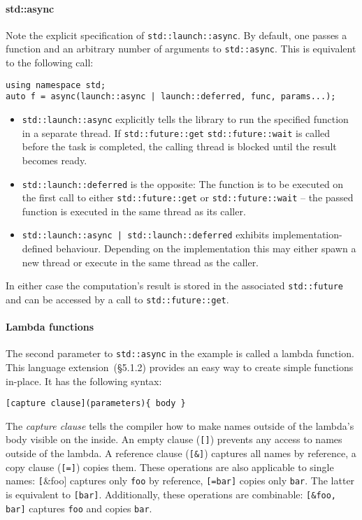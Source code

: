\paragraph{std::async}

Note the explicit specification of \texttt{std::launch::async}. By default, one passes a function and an arbitrary number of arguments to \texttt{std::async}. This is equivalent to the following call:

\begin{lstlisting}
using namespace std;
auto f = async(launch::async | launch::deferred, func, params...);
\end{lstlisting}

\begin{itemize}
\item \texttt{std::launch::async} explicitly tells the library to run the specified function in a separate thread. If \texttt{std::future::get} \texttt{std::future::wait} is called before the task is completed, the calling thread is blocked until the result becomes ready.
\item \texttt{std::launch::deferred} is the opposite: The function is to be executed on the first call to either \texttt{std::future::get} or \texttt{std::future::wait} -- the passed function is executed in the same thread as its caller.
\item \texttt{std::launch::async | std::launch::deferred} exhibits implementation-defined behaviour. Depending on the implementation this may either spawn a new thread or execute in the same thread as the caller.
\end{itemize}

In either case the computation's result is stored in the associated \texttt{std::future} and can be accessed by a call to \texttt{std::future::get}.

\paragraph{Lambda functions}

The second parameter to \texttt{std::async} in the example is called a lambda function. This language extension~\cite{cpp11std}(§5.1.2) provides an easy way to create simple functions in-place. It has the following syntax:

\begin{verbatim}
[capture clause](parameters){ body }
\end{verbatim}

The \textit{capture clause} tells the compiler how to make names outside of the lambda's body visible on the inside. An empty clause (\texttt{[]}) prevents any access to names outside of the lambda. A reference clause (\texttt{[\&]}) captures all names by reference, a copy clause (\texttt{[=]}) copies them. These operations are also applicable to single names: \texttt[\&foo] captures only \texttt{foo} by reference, \texttt{[=bar]} copies only \texttt{bar}. The latter is equivalent to \texttt{[bar]}. Additionally, these operations are combinable: \texttt{[\&foo, bar]} captures \texttt{foo} and copies \texttt{bar}.

